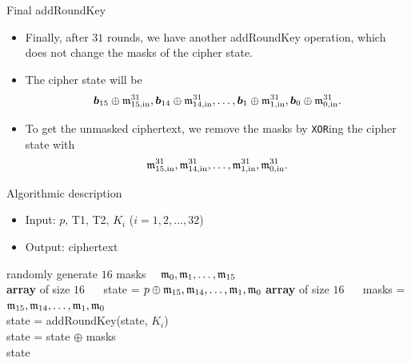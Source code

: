 \begin{frame}{Final addRoundKey}
    \begin{itemize}
        \item Finally, after $31$ rounds, we have another addRoundKey operation, which does not change the masks of the cipher state.
\item The cipher state will be
\[
\boldsymbol{b}_{15}\oplus{\mathfrak m}^{31}_{15,\text{in}},\boldsymbol{b}_{14}\oplus{\mathfrak m}^{31}_{14,\text{in}},\dots,\boldsymbol{b}_1\oplus{\mathfrak m}^{31}_{1,\text{in}},\boldsymbol{b}_0\oplus{\mathfrak m}^{31}_{0,\text{in}}.
\]
\item To get the unmasked ciphertext, we remove the masks by \texttt{XOR}ing the cipher state with
\[
{\mathfrak m}^{31}_{15,\text{in}},{\mathfrak m}^{31}_{14,\text{in}},\dots,{\mathfrak m}^{31}_{1,\text{in}},{\mathfrak m}^{31}_{0,\text{in}}.
\]
    \end{itemize}
\end{frame}

\begin{frame}{Algorithmic description}
\begin{itemize}
    \item Input: $p$, T1, T2, $K_i$ ($i=1,2,\dots,32$)
    \item Output: ciphertext
\end{itemize}
{
\setlength{\interspacetitleruled}{0pt}%
\setlength{\algotitleheightrule}{0pt}%
{\small
    \begin{algorithm}[H]
randomly generate $16$ masks $\quad{\mathfrak m}_0,{\mathfrak m}_1,\dots,{\mathfrak m}_{15}$\\
\textbf{array} of size $16$ $\quad$ state = $p\oplus {\mathfrak m}_{15},{\mathfrak m}_{14},\dots,{\mathfrak m}_{1},{\mathfrak m}_0$
\textbf{array} of size $16$ $\quad$ masks = ${\mathfrak m}_{15},{\mathfrak m}_{14},\dots,{\mathfrak m}_{1},{\mathfrak m}_0$\\
    state = addRoundKey(state, $K_i$)\\
    state = state $\oplus$ masks\\
    \Return state
\end{algorithm}}}
\end{frame}

